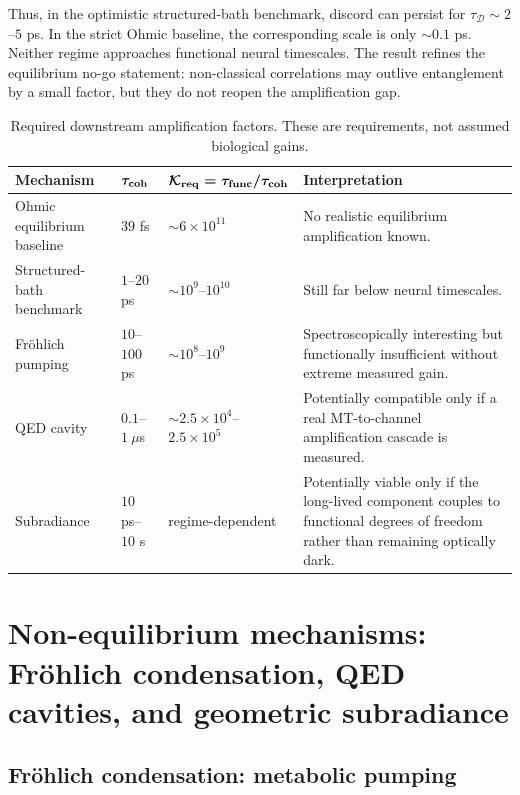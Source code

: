 \documentclass[twocolumn,10pt]{article}
\begin{document}
Thus, in the optimistic structured-bath benchmark, discord can persist for
$\tau_{\mathcal{D}}\sim2$--$5$ ps. In the strict Ohmic baseline, the
corresponding scale is only $\sim0.1$ ps. Neither regime approaches
functional neural timescales. The result refines the equilibrium no-go
statement: non-classical correlations may outlive entanglement by a small
factor, but they do not reopen the amplification gap.

\begin{table}[t]
\centering
\caption{Required downstream amplification factors. These are requirements,
not assumed biological gains.}
\label{tab:K_required}
\footnotesize
\begin{tabular}{p{3.2cm}p{2.5cm}p{3.0cm}p{5.0cm}}
\toprule
\textbf{Mechanism} & $\boldsymbol{\tau_{\rm coh}}$ &
$\boldsymbol{\mathcal{K}_{\rm req}=\tau_{\rm func}/\tau_{\rm coh}}$ &
\textbf{Interpretation} \\
\midrule
Ohmic equilibrium baseline & $39$ fs & $\sim6\times10^{11}$ &
No realistic equilibrium amplification known. \\
Structured-bath benchmark & $1$--$20$ ps & $\sim10^9$--$10^{10}$ &
Still far below neural timescales. \\
Fr\"ohlich pumping & $10$--$100$ ps & $\sim10^8$--$10^9$ &
Spectroscopically interesting but functionally insufficient without extreme
measured gain. \\
QED cavity & $0.1$--$1~\mu$s & $\sim2.5\times10^4$--$2.5\times10^5$ &
Potentially compatible only if a real MT-to-channel amplification cascade is
measured. \\
Subradiance & $10$ ps--$10$ s & regime-dependent &
Potentially viable only if the long-lived component couples to functional
degrees of freedom rather than remaining optically dark. \\
\bottomrule
\end{tabular}
\end{table}

\section{Non-equilibrium mechanisms: Fr\"ohlich condensation, QED cavities,
and geometric subradiance}
\subsection{Fr\"ohlich condensation: metabolic pumping}
\end{document}

